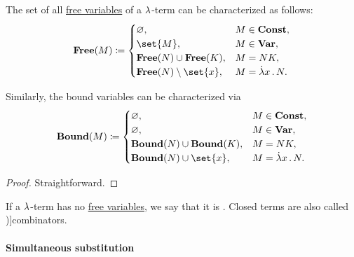 \begin{proposition}\label{thm:lambda_variable_freeness_characterization}
  The set of all \hyperref[def:lambda_variable_freeness]{free variables} of a \( {\mathrm \lambda} \)-term can be characterized as follows:
  \begin{equation*}
    \op*{Free}(M) \coloneqq \begin{cases}
      \varnothing,                       &M \in \op*{Const}, \\
      \set{ M },                         &M \in \op*{Var}, \\
      \op*{Free}(N) \cup \op*{Free}(K),  &M = N K, \\
      \op*{Free}(N) \setminus \set{ x }, &M = \qabs x N. \\
    \end{cases}
  \end{equation*}

  Similarly, the bound variables can be characterized via
  \begin{equation*}
    \op*{Bound}(M) \coloneqq \begin{cases}
      \varnothing,                        &M \in \op*{Const}, \\
      \varnothing,                        &M \in \op*{Var}, \\
      \op*{Bound}(N) \cup \op*{Bound}(K), &M = N K, \\
      \op*{Bound}(N) \cup \set{ x },      &M = \qabs x N. \\
    \end{cases}
  \end{equation*}
\end{proposition}
\begin{proof}
  Straightforward.
\end{proof}

\begin{definition}\label{def:lambda_combinator}
  If a \( {\mathrm \lambda} \)-term has no \hyperref[def:lambda_variable_freeness]{free variables}, we say that it is . Closed terms are also called \term[ru=комбинаторы (\cite[188]{Герасимов2011Вычислимость})]{combinators}.
\end{definition}

\paragraph{Simultaneous substitution}

